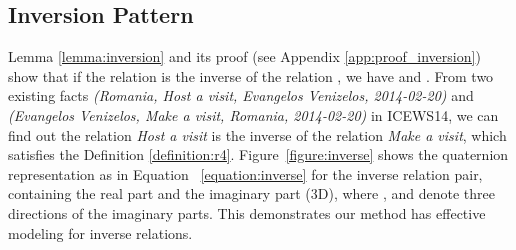 \documentclass[11pt]{article}
\begin{document}
\subsection{Inversion Pattern}

Lemma \ref{lemma:inversion} and its proof (see Appendix \ref{app:proof_inversion}) show that if the relation  is the inverse of the relation , we have  and .
From two existing facts \textit{(Romania, Host a visit, Evangelos Venizelos, 2014-02-20)} and \textit{(Evangelos Venizelos, Make a visit, Romania, 2014-02-20)} in ICEWS14, we can find out the relation \textit{Host a visit} is the inverse of the relation \textit{Make a visit}, which satisfies the Definition \ref{definition:r4}.
Figure~\ref{figure:inverse} shows the quaternion representation as in Equation~ \ref{equation:inverse} for the inverse relation pair, containing the real part and the imaginary part (3D), where ,  and  denote three directions of the imaginary parts.
This demonstrates our method has effective modeling for inverse relations.
\end{document}
